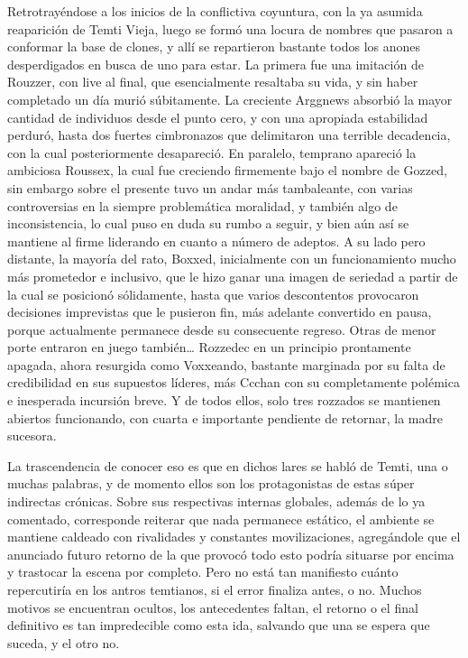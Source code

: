 \documentclass[
  spanish,
]{book}
\begin{document}
Retrotrayéndose a los inicios de la conflictiva coyuntura, con la ya asumida reaparición de Temti Vieja, luego se formó una locura de nombres que pasaron a conformar la base de clones, y allí se repartieron bastante todos los anones desperdigados en busca de uno para estar. La primera fue una imitación de Rouzzer, con live al final, que esencialmente resaltaba su vida, y sin haber completado un día murió súbitamente. La creciente Arggnews absorbió la mayor cantidad de individuos desde el punto cero, y con una apropiada estabilidad perduró, hasta dos fuertes cimbronazos que delimitaron una terrible decadencia, con la cual posteriormente desapareció. En paralelo, temprano apareció la ambiciosa Roussex, la cual fue creciendo firmemente bajo el nombre de Gozzed, sin embargo sobre el presente tuvo un andar más tambaleante, con varias controversias en la siempre problemática moralidad, y también algo de inconsistencia, lo cual puso en duda su rumbo a seguir, y bien aún así se mantiene al firme liderando en cuanto a número de adeptos. A su lado pero distante, la mayoría del rato, Boxxed, inicialmente con un funcionamiento mucho más prometedor e inclusivo, que le hizo ganar una imagen de seriedad a partir de la cual se posicionó sólidamente, hasta que varios descontentos provocaron decisiones imprevistas que le pusieron fin, más adelante convertido en pausa, porque actualmente permanece desde su consecuente regreso. Otras de menor porte entraron en juego también\ldots{} Rozzedec en un principio prontamente apagada, ahora resurgida como Voxxeando, bastante marginada por su falta de credibilidad en sus supuestos líderes, más Ccchan con su completamente polémica e inesperada incursión breve. Y de todos ellos, solo tres rozzados se mantienen abiertos funcionando, con cuarta e importante pendiente de retornar, la madre sucesora.

La trascendencia de conocer eso es que en dichos lares se habló de Temti, una o muchas palabras, y de momento ellos son los protagonistas de estas súper indirectas crónicas. Sobre sus respectivas internas globales, además de lo ya comentado, corresponde reiterar que nada permanece estático, el ambiente se mantiene caldeado con rivalidades y constantes movilizaciones, agregándole que el anunciado futuro retorno de la que provocó todo esto podría situarse por encima y trastocar la escena por completo. Pero no está tan manifiesto cuánto repercutiría en los antros temtianos, si el error finaliza antes, o no. Muchos motivos se encuentran ocultos, los antecedentes faltan, el retorno o el final definitivo es tan impredecible como esta ida, salvando que una se espera que suceda, y el otro no.
\end{document}
